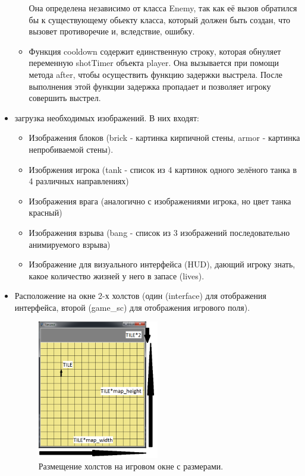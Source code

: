 \begin{itemize}
\begin{itemize}
    Она определена независимо от класса Enemy, так как её вызов обратился бы к существующему обьекту класса, который должен быть создан, что вызовет противоречие и, вследствие, ошибку.
    \item Функция cooldown содержит единственную строку, которая обнуляет переменную shotTimer объекта player. Она вызывается при помощи метода after, чтобы осуществить функцию задержки выстрела. После выполнения этой функции задержка пропадает и позволяет игроку совершить выстрел.
    \end{itemize}
\item загрузка необходимых изображений. В них входят:
    \begin{itemize}
    \item Изображения блоков (brick - картинка кирпичной стены, armor - картинка непробиваемой стены).
    \item Изобржения игрока (tank - список из 4 картинок одного зелёного танка в 4 различных направлениях)
    \item Изображения врага (аналогично с изображениями игрока, но цвет танка красный)
    \item Изображения взрыва (bang - список из 3 изображений последовательно анимируемого взрыва)
    \item Изображение для визуального интерфейса (HUD), дающий игроку знать, какое количество жизней у него в запасе (lives).
    \end{itemize}
\item Расположение на окне 2-х холстов (один (interface) для отображения интерфейса, второй (game\_sc) для отображения игрового поля).
\begin{figure}[h]
    \centering
    \includegraphics[width=0.5\textwidth]{./images/image1.png}
    \caption{\centering\label{fig:example05}Размещение холстов на игровом окне с размерами.}
\end{figure}


\end{itemize}
